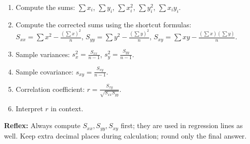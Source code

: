 \documentclass[11pt]{article}
\begin{document}
\begin{methode}
\begin{enumerate}
\item Compute the sums: $\sum x_i$, $\sum y_i$, $\sum x_i^2$, $\sum y_i^2$, $\sum x_i y_i$.
\item Compute the corrected sums using the shortcut formulas:
$S_{xx} = \sum x^2 - \frac{(\sum x)^2}{n}$,
$S_{yy} = \sum y^2 - \frac{(\sum y)^2}{n}$,
$S_{xy} = \sum xy - \frac{(\sum x)(\sum y)}{n}$.
\item Sample variances: $s_x^2 = \frac{S_{xx}}{n-1}$, $s_y^2 = \frac{S_{yy}}{n-1}$.
\item Sample covariance: $s_{xy} = \frac{S_{xy}}{n-1}$.
\item Correlation coefficient: $r = \frac{S_{xy}}{\sqrt{S_{xx} S_{yy}}}$.
\item Interpret $r$ in context.
\end{enumerate}
\textbf{Reflex:} Always compute $S_{xx}, S_{yy}, S_{xy}$ first; they are used in regression lines as well. Keep extra decimal places during calculation; round only the final answer.
\end{methode}
\end{document}
